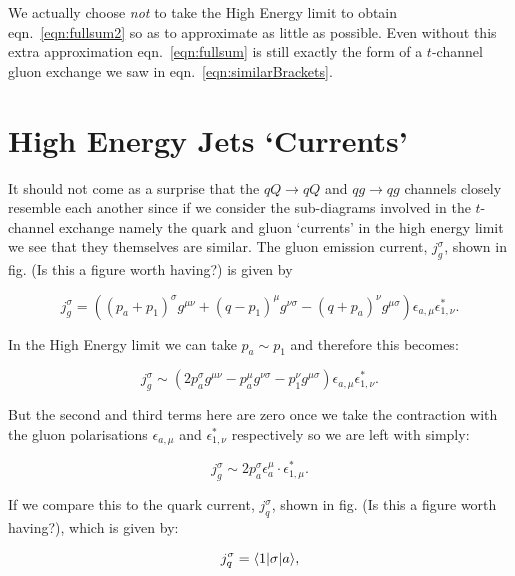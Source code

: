 			We actually choose \emph{not} to take the High Energy limit to obtain eqn.~\eqref{eqn:fullsum2} so as to approximate
			as little as possible.  Even without this extra approximation eqn.~\eqref{eqn:fullsum} is still exactly the form of
			a $t$-channel gluon exchange we saw in eqn.~\eqref{eqn:similarBrackets}.

	\section{High Energy Jets `Currents'}
		\label{sec:currents}

		It should not come as a surprise that the $qQ\rightarrow qQ$ and $qg\rightarrow qg$ channels closely resemble
		each another since if we consider the sub-diagrams involved in the $t$-channel exchange namely the quark and
		gluon `currents' in the high energy limit we see that they themselves are similar.  The gluon emission
		current, $j_{g}^\sigma$, shown in fig. (Is this a figure worth having?) is given by

		\begin{equation}
			j_{g}^\sigma = \left((p_a+p_1)^\sigma g^{\mu\nu} + (q - p_1)^\mu g^{\nu\sigma} -
			(q + p_a)^\nu g^{\mu\sigma}\right)\epsilon_{a, \mu}\epsilon_{1, \nu}^*.
		\end{equation}

		In the High Energy limit we can take $p_a\sim p_1$ and therefore this becomes:

		\begin{equation}
			j_{g}^\sigma \sim \left(2p_a^\sigma g^{\mu\nu} - p_a^\mu g^{\nu\sigma} -
			p_1^\nu g^{\mu\sigma}\right)\epsilon_{a, \mu}\epsilon_{1, \nu}^*.
		\end{equation}

		But the second and third terms here are zero once we take the contraction with the gluon polarisations $\epsilon_{a, \mu}$
		and $\epsilon_{1, \nu}^*$ respectively so we are left with simply:

		\begin{equation}
			j_{g}^\sigma \sim 2p_a^\sigma\epsilon_{a}^\mu\cdot\epsilon_{1, \mu}^*.
			\label{eqn:gluonCurrent}
		\end{equation}

		If we compare this to the quark current, $j_{q}^\sigma$, shown in fig. (Is this a figure worth having?),
		which is given by:

		\begin{equation}
			j_{q}^\sigma = \langle 1 | \sigma | a \rangle,
		\end{equation}

